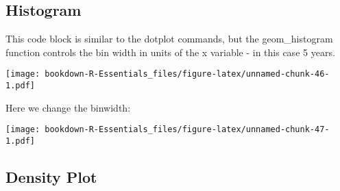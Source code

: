 \documentclass[]{book}
\newenvironment{Shaded}{\begin{snugshade}}{\end{snugshade}}
\newcommand{\KeywordTok}[1]{\textcolor[rgb]{0.13,0.29,0.53}{\textbf{#1}}}
\newcommand{\DataTypeTok}[1]{\textcolor[rgb]{0.13,0.29,0.53}{#1}}
\newcommand{\DecValTok}[1]{\textcolor[rgb]{0.00,0.00,0.81}{#1}}
\newcommand{\FloatTok}[1]{\textcolor[rgb]{0.00,0.00,0.81}{#1}}
\newcommand{\StringTok}[1]{\textcolor[rgb]{0.31,0.60,0.02}{#1}}
\newcommand{\OperatorTok}[1]{\textcolor[rgb]{0.81,0.36,0.00}{\textbf{#1}}}
\newcommand{\NormalTok}[1]{#1}
\begin{document}
\subsection{Histogram}\label{histogram}

This code block is similar to the dotplot commands, but the
geom\_histogram function controls the bin width in units of the x
variable - in this case 5 years.

\begin{Shaded}
\end{Shaded}

\texttt{[image: bookdown-R-Essentials\_files/figure-latex/unnamed-chunk-46-1.pdf]}

Here we change the binwidth:

\begin{Shaded}
\end{Shaded}

\texttt{[image: bookdown-R-Essentials\_files/figure-latex/unnamed-chunk-47-1.pdf]}

\subsection{Density Plot}\label{density-plot}
\end{document}
